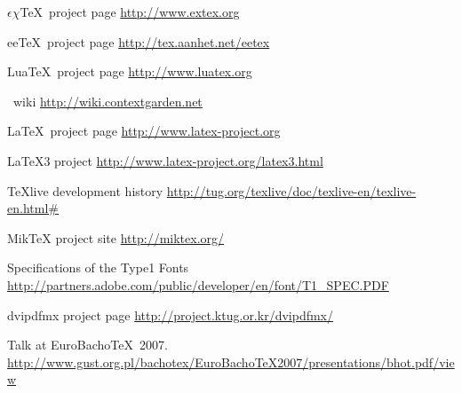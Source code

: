 \documentclass{scrartcl}
\begin{document}
\begin{thebibliography}{10}
	{$\epsilon\chi$\TeX\ project page}
	\newblock \url{http://www.extex.org}
	
	{ee\TeX\ project page}
	\newblock \url{http://tex.aanhet.net/eetex}
	
	{Lua\TeX\ project page}
	\newblock \url{http://www.luatex.org}
	
	\vspace{2ex}
	\vspace{1ex}
	\ConTeXt\ wiki
	\newblock \url{http://wiki.contextgarden.net}
	
	{\LaTeX\ project page}
	\newblock \url{http://www.latex-project.org}
	
	{\LaTeX3 project}
	\newblock \url{http://www.latex-project.org/latex3.html}
	
	\vspace{2ex}
	\vspace{1ex}
	{TeXlive development history}
	\newblock \url{http://tug.org/texlive/doc/texlive-en/texlive-en.html#}

	{MikTeX project site}
	\newblock \url{http://miktex.org/}

	\vspace{2ex}
	\vspace{1ex}

	{Specifications of the Type1 Fonts}
	\newblock \url{http://partners.adobe.com/public/developer/en/font/T1_SPEC.PDF}

	\vspace{2ex}
	\vspace{1ex}
	{dvipdfmx project page}
	\newblock \url{http://project.ktug.or.kr/dvipdfmx/}
	
	\vspace{2ex}
	\vspace{1ex}
	\newblock Talk at EuroBacho\TeX\ 2007.\\
	\newblock \url{http://www.gust.org.pl/bachotex/EuroBachoTeX2007/presentations/bhot.pdf/view}
	

\end{thebibliography}
\end{document}
